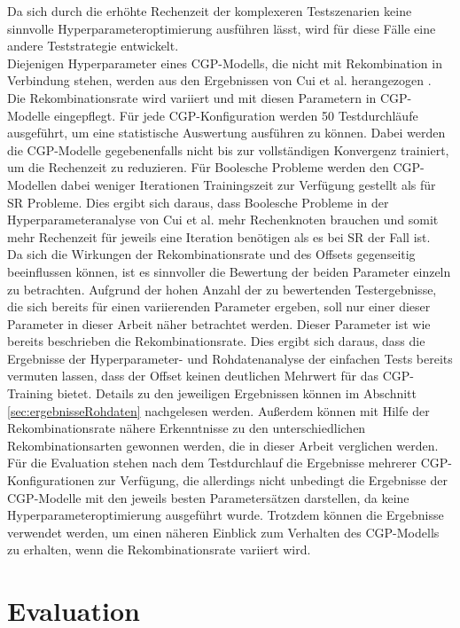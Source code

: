 Da sich durch die erhöhte Rechenzeit der komplexeren Testszenarien keine sinnvolle Hyperparameteroptimierung ausführen lässt, wird für diese Fälle eine andere Teststrategie entwickelt.\\
Diejenigen Hyperparameter eines CGP-Modells, die nicht mit Rekombination in Verbindung stehen, werden aus den Ergebnissen von Cui et al. herangezogen \cite{cui_results}.
Die Rekombinationsrate wird variiert und mit diesen Parametern in CGP-Modelle eingepflegt.
Für jede CGP-Konfiguration werden 50 Testdurchläufe ausgeführt, um eine statistische Auswertung ausführen zu können.
Dabei werden die CGP-Modelle gegebenenfalls nicht bis zur vollständigen Konvergenz trainiert, um die Rechenzeit zu reduzieren. 
Für Boolesche Probleme werden den CGP-Modellen dabei weniger Iterationen Trainingszeit zur Verfügung gestellt als für SR Probleme.
Dies ergibt sich daraus, dass Boolesche Probleme in der Hyperparameteranalyse von Cui et al. mehr Rechenknoten brauchen und somit mehr Rechenzeit für jeweils eine Iteration benötigen als es bei SR der Fall ist. \cite{cui_results}\\
Da sich die Wirkungen der Rekombinationsrate und des Offsets gegenseitig beeinflussen können, ist es sinnvoller die Bewertung der beiden Parameter einzeln zu betrachten.
Aufgrund der hohen Anzahl der zu bewertenden Testergebnisse, die sich bereits für einen variierenden Parameter ergeben, soll nur einer dieser Parameter in dieser Arbeit näher betrachtet werden.
Dieser Parameter ist wie bereits beschrieben die Rekombinationsrate.
Dies ergibt sich daraus, dass die Ergebnisse der Hyperparameter- und Rohdatenanalyse der einfachen Tests bereits vermuten lassen, dass der Offset keinen deutlichen Mehrwert für das CGP-Training bietet.
Details zu den jeweiligen Ergebnissen können im Abschnitt \ref{sec:ergebnisseRohdaten} nachgelesen werden.
Außerdem können mit Hilfe der Rekombinationsrate nähere Erkenntnisse zu den unterschiedlichen Rekombinationsarten gewonnen werden, die in dieser Arbeit verglichen werden.\\
Für die Evaluation stehen nach dem Testdurchlauf die Ergebnisse mehrerer CGP-Kon\-fi\-gu\-ra\-tio\-nen zur Verfügung, die allerdings nicht unbedingt die Ergebnisse der CGP-Modelle mit den jeweils besten Parametersätzen darstellen, da keine Hyperparameteroptimierung ausgeführt wurde.
Trotzdem können die Ergebnisse verwendet werden, um einen näheren Einblick zum Verhalten des CGP-Modells zu erhalten, wenn die Rekombinationsrate variiert wird.


\section{Evaluation}
\label{sec:Evaluation}

